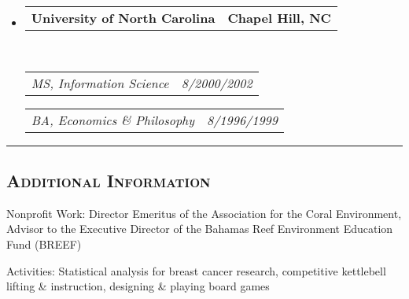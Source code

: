 \documentclass[12pt,letterpaper,oneside]{article}
\makeatletter
\newenvironment{indentsection}[1]%
{\begin{list}{}%
	{\setlength{\leftmargin}{#1}}%
	\item[]%
}
{\end{list}}
\newcommand{\headerrow}[2]
{\begin{tabular*}{\linewidth}{l@{\extracolsep{\fill}}r}
	#1 &
	#2 \\
\end{tabular*}}
\makeatother
\begin{document}
\begin{itemize}
	\parskip=0.1em

	\item
	
	\headerrow
		{\textbf{University of North Carolina}}
		{\textbf{Chapel Hill, NC}}
	\\
	\headerrow
		{\emph{MS, Information Science}}
		{\emph{8/2000\textendash 12/2002}}
	\headerrow
		{\emph{BA, Economics \& Philosophy}}
		{\emph{8/1996\textendash 12/1999}}
	\vspace{-6mm}

\end{itemize}

\hrule
\vspace{-0.4em}
\subsection*{\centering\textsc{Additional Information}}

\begin{indentsection}{6mm}
\begin{description*}
	\setlength\itemsep{0.3em}
	\item[Nonprofit Work:]	Director Emeritus of the Association for the Coral Environment, \\
	Advisor to the Executive Director of the Bahamas Reef Environment Education Fund (BREEF)
	\item[Activities:] Statistical analysis for breast cancer research, competitive kettlebell lifting \& instruction, designing \& playing board games
\end{description*}
\end{indentsection}
\end{document}
